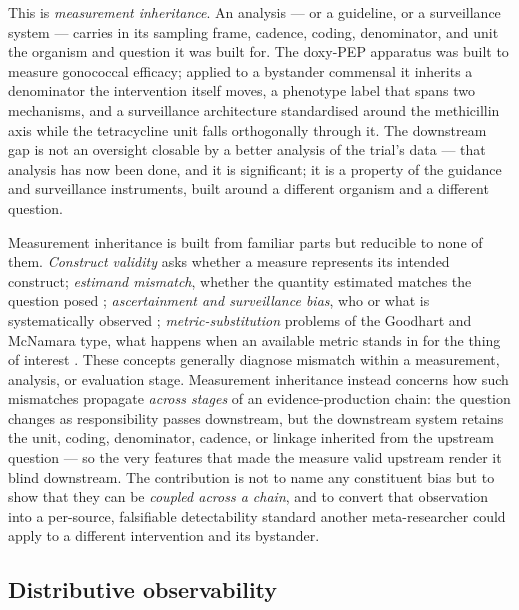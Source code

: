 \documentclass[10pt,letterpaper]{article}
\begin{document}
This is \emph{measurement inheritance}. An analysis --- or a guideline,
or a surveillance system --- carries in its sampling frame, cadence,
coding, denominator, and unit the organism and question it was built
for. The doxy-PEP apparatus was built to measure gonococcal efficacy;
applied to a bystander commensal it inherits a denominator the
intervention itself moves, a phenotype label that spans two mechanisms,
and a surveillance architecture standardised around the methicillin axis
while the tetracycline unit falls orthogonally through it. The
downstream gap is not an oversight closable by a better analysis of the
trial's data --- that analysis has now been done, and it is significant;
it is a property of the guidance and surveillance instruments, built
around a different organism and a different question.

Measurement inheritance is built from familiar parts but reducible to
none of them. \emph{Construct validity} asks whether a measure
represents its intended construct; \emph{estimand mismatch}, whether the
quantity estimated matches the question posed \cite{montoya2025estimand}; \emph{ascertainment and
surveillance bias}, who or what is systematically observed \cite{tancredi2024surveillance};
\emph{metric-substitution} problems of the Goodhart and McNamara type,
what happens when an available metric stands in for the thing of interest \cite{treem2023visibility}. These concepts generally diagnose mismatch within a measurement, analysis, or evaluation stage. Measurement inheritance instead concerns how such mismatches propagate \emph{across stages} of an evidence-production chain: the question changes as responsibility passes
downstream, but the downstream system retains the unit, coding,
denominator, cadence, or linkage inherited from the upstream question
--- so the very features that made the measure valid upstream render it
blind downstream. The contribution is not to name any constituent bias
but to show that they can be \emph{coupled across a chain}, and to
convert that observation into a per-source, falsifiable detectability
standard another meta-researcher could apply to a different intervention
and its bystander.

\subsection*{Distributive observability}
\end{document}
